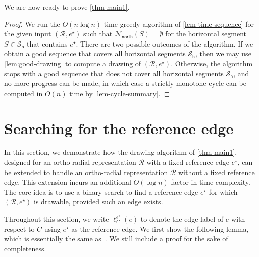 \documentclass{theoretics}
\newcommand{\RR}{\mathcal{R}}
\newcommand{\PH}{\mathcal{S}_\mathsf{h}}
\newcommand{\Nnorth}{\mathcal{N}_\mathsf{north}}
\newcommand{\eref}{e^\star}
\begin{document}
We are now ready to prove \cref{thm-main1}.

\thmone*

\begin{proof}%
We run the $O(n \log n)$-time greedy algorithm of \cref{lem-time-sequence} for the given input $(\RR, \eref)$  such that $\Nnorth(S) = \emptyset$ for the horizontal segment $S\in \PH$ that contains $\eref$. 
There are two possible outcomes of the algorithm. If we obtain a good sequence that covers all horizontal segments $\PH$, then we may use \cref{lem:good-drawing} to compute a drawing of $(\RR, \eref)$. Otherwise, the algorithm stops with a good sequence that does not cover all horizontal segments $\PH$, and no more progress can be made, in which case a strictly monotone cycle can be computed in $O(n)$ time by \cref{lem-cycle-summary}.
\end{proof}
 

\section{Searching for the reference edge}\label{sect:binary-search}

In this section, we demonstrate how the drawing algorithm of \cref{thm-main1}, designed for an ortho-radial representation $\RR$ with a fixed reference edge $\eref$, can be extended to handle an ortho-radial representation $\RR$ without a fixed reference edge. This extension incurs an additional $O(\log n)$ factor in time complexity. The core idea is to use a binary search to find a reference edge $\eref$ for which $(\RR, \eref)$ is drawable, provided such an edge exists.


Throughout this section, we write $\ell_C^{\eref}(e)$ to denote the edge label of $e$ with respect to $C$ using $\eref$ as the reference edge. We first show the following lemma, which is essentially the same as~\cite[Lemma 4.2]{barth2023topology}. We still include a proof for the sake of completeness.
\end{document}
